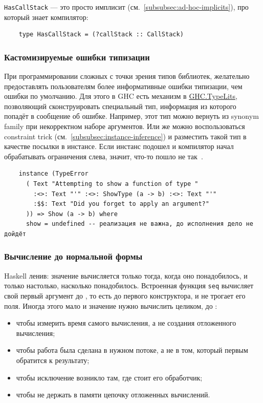 \texttt{HasCallStack} --- это просто имплисит (см.~\ref{subsubsec:ad-hoc-implicits}), про который знает компилятор:
\begin{verbatim}
    type HasCallStack = (?callStack :: CallStack)
\end{verbatim}

\subsubsection{Кастомизируемые ошибки типизации} \label{subsubsec:custom-type-errors}

При программировании сложных с точки зрения типов библиотек, желательно предоставлять пользователям более информативные ошибки типизации, чем ошибки по умолчанию.
Для этого в GHC есть механизм в \href{https://hackage.haskell.org/package/base-4.20.0.1/docs/GHC-TypeLits.html}{GHC.TypeLits}, позволяющий сконструировать специальный тип, информация из которого попадёт в сообщение об ошибке.
Например, этот тип можно вернуть из synonym family при некорректном наборе аргументов.
Или же можно воспользоваться constraint trick (см.\ \ref{subsubsec:instance-inference}) и разместить такой тип в качестве посылки в инстансе.
Если инстанс подошел и компилятор начал обрабатывать ограничения слева, значит, что-то пошло не так~\cite[глава 12]{maguire-types}.

\begin{verbatim}
    instance (TypeError
      ( Text "Attempting to show a function of type "
        :<>: Text "'" :<>: ShowType (a -> b) :<>: Text "'"
        :$$: Text "Did you forget to apply an argument?"
      )) => Show (a -> b) where
      show = undefined -- реализация не важна, до исполнения дело не дойдёт
\end{verbatim}

\subsubsection{Вычисление до нормальной формы} \label{subsubsec:nfdata}

Haskell ленив: значение вычисляется только тогда, когда оно понадобилось, и только настолько, насколько понадобилось.
Встроенная функция \texttt{seq} вычисляет свой первый аргумент до , то есть до первого конструктора, и не трогает его поля.
Иногда этого мало и значение нужно вычислить целиком, до :
\begin{itemize}
    \item чтобы измерить время самого вычисления, а не создания отложенного вычисления;
    \item чтобы работа была сделана в нужном потоке, а не в том, который первым обратится к результату;
    \item чтобы исключение возникло там, где стоит его обработчик;
    \item чтобы не держать в памяти цепочку отложенных вычислений.
\end{itemize}

